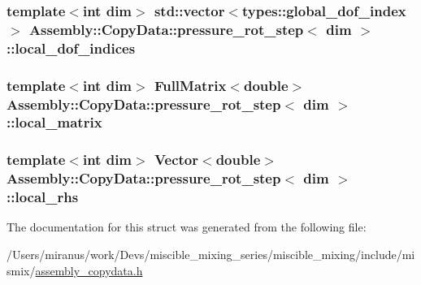 \subsubsection[{local\+\_\+dof\+\_\+indices}]{\setlength{\rightskip}{0pt plus 5cm}template$<$int dim$>$ std\+::vector$<$types\+::global\+\_\+dof\+\_\+index$>$ {\bf Assembly\+::\+Copy\+Data\+::pressure\+\_\+rot\+\_\+step}$<$ dim $>$\+::local\+\_\+dof\+\_\+indices}\label{struct_assembly_1_1_copy_data_1_1pressure__rot__step_ade1a65d97b3092835d27a4cd6295482f}
\hypertarget{struct_assembly_1_1_copy_data_1_1pressure__rot__step_a316a4598a7bed63334bcb4699469f366}{}
\subsubsection[{local\+\_\+matrix}]{\setlength{\rightskip}{0pt plus 5cm}template$<$int dim$>$ Full\+Matrix$<$double$>$ {\bf Assembly\+::\+Copy\+Data\+::pressure\+\_\+rot\+\_\+step}$<$ dim $>$\+::local\+\_\+matrix}\label{struct_assembly_1_1_copy_data_1_1pressure__rot__step_a316a4598a7bed63334bcb4699469f366}
\hypertarget{struct_assembly_1_1_copy_data_1_1pressure__rot__step_a43d09c97e5a67574fd254c7539b8d439}{}
\subsubsection[{local\+\_\+rhs}]{\setlength{\rightskip}{0pt plus 5cm}template$<$int dim$>$ Vector$<$double$>$ {\bf Assembly\+::\+Copy\+Data\+::pressure\+\_\+rot\+\_\+step}$<$ dim $>$\+::local\+\_\+rhs}\label{struct_assembly_1_1_copy_data_1_1pressure__rot__step_a43d09c97e5a67574fd254c7539b8d439}


The documentation for this struct was generated from the following file\+:\begin{DoxyCompactItemize}
\item 
/\+Users/miranus/work/\+Devs/miscible\+\_\+mixing\+\_\+series/miscible\+\_\+mixing/include/mismix/\hyperlink{assembly__copydata_8h}{assembly\+\_\+copydata.\+h}\end{DoxyCompactItemize}
